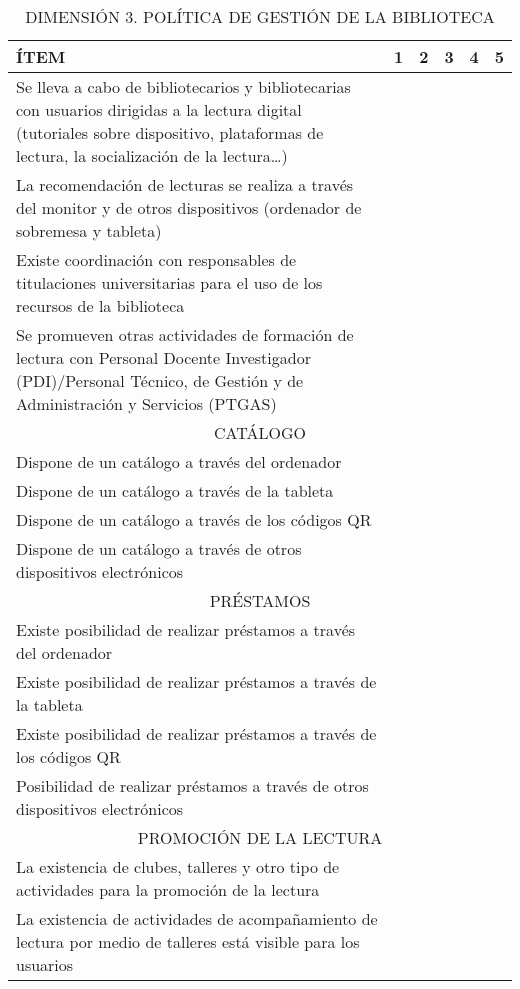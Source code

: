 \documentclass[spanish]{textolivre}
\begin{document}
\begin{small}
\centering
\begin{longtable}{p{8cm} |l|l|l|l|l}
\caption{DIMENSIÓN 3. POLÍTICA DE GESTIÓN DE LA BIBLIOTECA}
\label{longtbl-03}
\\
\toprule
ÍTEM & 1 & 2 & 3 & 4 & 5 \\
\midrule
Se lleva a cabo de bibliotecarios y bibliotecarias  con usuarios dirigidas a la lectura digital (tutoriales sobre dispositivo, plataformas de lectura, la socialización de la lectura…) & & & & & \\
\midrule
La recomendación de lecturas se realiza a través del monitor y de otros dispositivos (ordenador de sobremesa y tableta) & & & & & \\
\midrule
Existe coordinación con responsables de titulaciones universitarias para el uso de los recursos de la biblioteca & & & & & \\
\midrule
Se promueven otras actividades de formación de lectura con Personal Docente Investigador (PDI)/Personal Técnico, de Gestión y de Administración y Servicios (PTGAS) & & & & & \\
\midrule
\multicolumn{6}{c}{CATÁLOGO} \\
\midrule
Dispone de un catálogo a través del ordenador & & & & & \\
\midrule
Dispone de un catálogo a través de la tableta & & & & & \\
\midrule
Dispone de un catálogo a través de los códigos QR & & & & & \\
\midrule
Dispone de un catálogo a través de otros dispositivos electrónicos & & & & & \\
\midrule
\multicolumn{6}{c}{PRÉSTAMOS} \\
\midrule
Existe posibilidad de realizar préstamos a través del ordenador & & & & & \\
\midrule
Existe posibilidad de realizar préstamos a través de la tableta & & & & & \\
\midrule
Existe posibilidad  de realizar préstamos a través de los códigos QR & & & & & \\
\midrule
Posibilidad de realizar préstamos a través de otros dispositivos electrónicos & & & & & \\ 
\midrule
\multicolumn{6}{c}{PROMOCIÓN DE LA LECTURA} \\
\midrule
La existencia de clubes, talleres y otro tipo de actividades para la promoción de la lectura & & & & & \\
\midrule
La existencia de actividades de acompañamiento de lectura por medio de talleres está visible para los usuarios & & & & & \\

\end{longtable}
\end{small}
\end{document}
